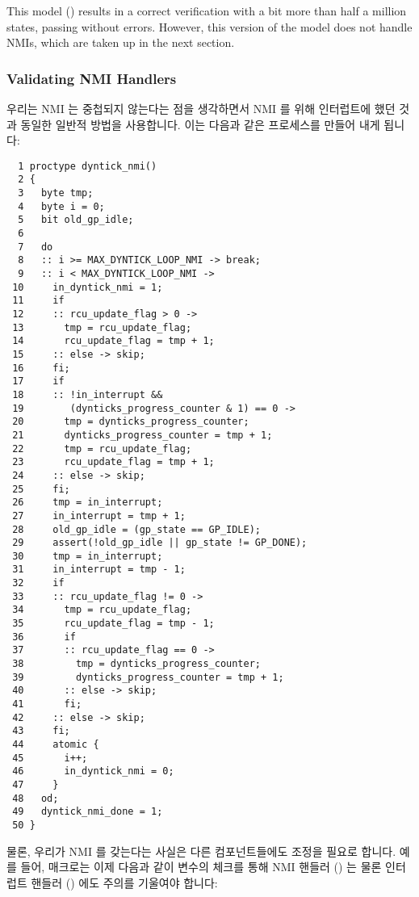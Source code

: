 This model ()
results in a correct verification with a bit more than half a million
states, passing without errors.
However, this version of the model does not handle NMIs,
which are taken up in the next section.
\fi

\subsubsection{Validating NMI Handlers}
\label{sec:formal:Validating NMI Handlers}

우리는 NMI 는 중첩되지 않는다는 점을 생각하면서 NMI 를 위해 인터럽트에 했던
것과 동일한 일반적 방법을 사용합니다.
이는 다음과 같은  프로세스를 만들어 내게 됩니다:
\iffalse

We take the same general approach for NMIs as we do for interrupts,
keeping in mind that NMIs do not nest.
This results in a \co{dyntick_nmi()} process as follows:
\fi

{ \scriptsize
\begin{verbatim}
  1 proctype dyntick_nmi()
  2 {
  3   byte tmp;
  4   byte i = 0;
  5   bit old_gp_idle;
  6
  7   do
  8   :: i >= MAX_DYNTICK_LOOP_NMI -> break;
  9   :: i < MAX_DYNTICK_LOOP_NMI ->
 10     in_dyntick_nmi = 1;
 11     if
 12     :: rcu_update_flag > 0 ->
 13       tmp = rcu_update_flag;
 14       rcu_update_flag = tmp + 1;
 15     :: else -> skip;
 16     fi;
 17     if
 18     :: !in_interrupt &&
 19        (dynticks_progress_counter & 1) == 0 ->
 20       tmp = dynticks_progress_counter;
 21       dynticks_progress_counter = tmp + 1;
 22       tmp = rcu_update_flag;
 23       rcu_update_flag = tmp + 1;
 24     :: else -> skip;
 25     fi;
 26     tmp = in_interrupt;
 27     in_interrupt = tmp + 1;
 28     old_gp_idle = (gp_state == GP_IDLE);
 29     assert(!old_gp_idle || gp_state != GP_DONE);
 30     tmp = in_interrupt;
 31     in_interrupt = tmp - 1;
 32     if
 33     :: rcu_update_flag != 0 ->
 34       tmp = rcu_update_flag;
 35       rcu_update_flag = tmp - 1;
 36       if
 37       :: rcu_update_flag == 0 ->
 38         tmp = dynticks_progress_counter;
 39         dynticks_progress_counter = tmp + 1;
 40       :: else -> skip;
 41       fi;
 42     :: else -> skip;
 43     fi;
 44     atomic {
 45       i++;
 46       in_dyntick_nmi = 0;
 47     }
 48   od;
 49   dyntick_nmi_done = 1;
 50 }
\end{verbatim}
}

물론, 우리가 NMI 를 갖는다는 사실은 다른 컴포넌트들에도 조정을 필요로 합니다.
예를 들어,  매크로는 이제 다음과 같이
 변수의 체크를 통해 NMI 핸들러 () 는
물론 인터럽트 핸들러 () 에도 주의를 기울여야 합니다:
\iffalse

